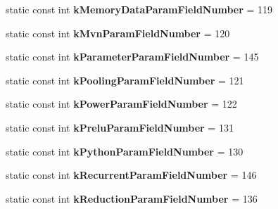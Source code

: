 \begin{DoxyCompactItemize}
\mbox{\label{classcaffe_1_1_layer_parameter_a2f6d36f5157cb13a9869a1d85bba9319}} 
static const int {\bfseries k\+Memory\+Data\+Param\+Field\+Number} = 119
\item 
\mbox{\label{classcaffe_1_1_layer_parameter_a176428115d6505dc5c4c1490d3c00c97}} 
static const int {\bfseries k\+Mvn\+Param\+Field\+Number} = 120
\item 
\mbox{\label{classcaffe_1_1_layer_parameter_a320999221c1ff9ccea73b2db82358597}} 
static const int {\bfseries k\+Parameter\+Param\+Field\+Number} = 145
\item 
\mbox{\label{classcaffe_1_1_layer_parameter_afffe183b93f3731297f20d9bde5f669c}} 
static const int {\bfseries k\+Pooling\+Param\+Field\+Number} = 121
\item 
\mbox{\label{classcaffe_1_1_layer_parameter_aaa4608d11c585b4ab8a4e0b572de7bb9}} 
static const int {\bfseries k\+Power\+Param\+Field\+Number} = 122
\item 
\mbox{\label{classcaffe_1_1_layer_parameter_a0b2020cda8d3565cf3731209b995f566}} 
static const int {\bfseries k\+Prelu\+Param\+Field\+Number} = 131
\item 
\mbox{\label{classcaffe_1_1_layer_parameter_a1516dfc889276015d77f11eb9f6d9d67}} 
static const int {\bfseries k\+Python\+Param\+Field\+Number} = 130
\item 
\mbox{\label{classcaffe_1_1_layer_parameter_aff9514d2fee799ce30cd40e1a8d68e67}} 
static const int {\bfseries k\+Recurrent\+Param\+Field\+Number} = 146
\item 
\mbox{\label{classcaffe_1_1_layer_parameter_af6dc5514a20055c49b034351c4c3d9df}} 
static const int {\bfseries k\+Reduction\+Param\+Field\+Number} = 136
\item 
\mbox{\label{classcaffe_1_1_layer_parameter_ad7c576e92ef836aec95499086597449f}} 

\end{DoxyCompactItemize}

